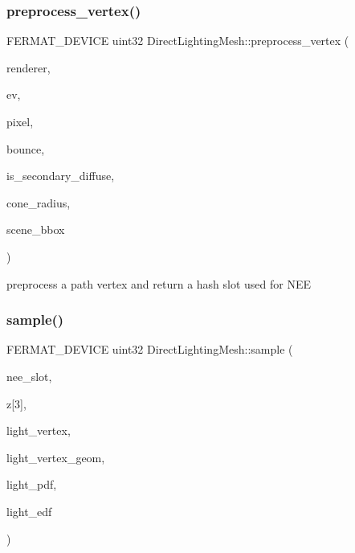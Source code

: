\subsubsection{\texorpdfstring{preprocess\+\_\+vertex()}{preprocess\_vertex()}}
{\footnotesize\ttfamily F\+E\+R\+M\+A\+T\+\_\+\+D\+E\+V\+I\+CE uint32 Direct\+Lighting\+Mesh\+::preprocess\+\_\+vertex (\begin{DoxyParamCaption}\item[{const \hyperlink{struct_rendering_context_view}{Rendering\+Context\+View} \&}]{renderer,  }\item[{const \hyperlink{struct_eye_vertex}{Eye\+Vertex} \&}]{ev,  }\item[{const uint32}]{pixel,  }\item[{const uint32}]{bounce,  }\item[{const bool}]{is\+\_\+secondary\+\_\+diffuse,  }\item[{const float}]{cone\+\_\+radius,  }\item[{const \hyperlink{structcugar_1_1_bbox}{cugar\+::\+Bbox3f}}]{scene\+\_\+bbox }\end{DoxyParamCaption})\hspace{0.3cm}{\ttfamily [inline]}}

preprocess a path vertex and return a hash slot used for N\+EE \mbox{\label{struct_direct_lighting_mesh_af509addd3c3bce6853b5721ac85cae4d}} 
\subsubsection{\texorpdfstring{sample()}{sample()}}
{\footnotesize\ttfamily F\+E\+R\+M\+A\+T\+\_\+\+D\+E\+V\+I\+CE uint32 Direct\+Lighting\+Mesh\+::sample (\begin{DoxyParamCaption}\item[{const uint32}]{nee\+\_\+slot,  }\item[{const float}]{z\mbox{[}3\mbox{]},  }\item[{\hyperlink{struct_vertex_geometry_id}{Vertex\+Geometry\+Id} $\ast$}]{light\+\_\+vertex,  }\item[{\hyperlink{struct_vertex_geometry}{Vertex\+Geometry} $\ast$}]{light\+\_\+vertex\+\_\+geom,  }\item[{float $\ast$}]{light\+\_\+pdf,  }\item[{\hyperlink{struct_edf}{Edf} $\ast$}]{light\+\_\+edf }\end{DoxyParamCaption})\hspace{0.3cm}{\ttfamily [inline]}}

